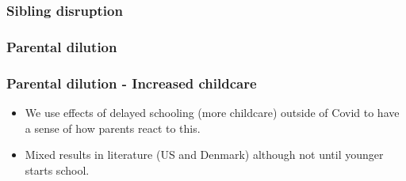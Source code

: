 \documentclass{beamer}
\begin{document}
\begin{frame}
    \label{frame:siblingdisruption}
    \frametitle{Sibling disruption}
        {
    }

\end{frame}

\begin{frame}
    \label{frame:parentaldilution}
    \frametitle{Parental dilution}
        {
    }

\end{frame}

\begin{frame}
    \label{frame:childcare}
    \frametitle{Parental dilution - Increased childcare}
       \begin{itemize}
            \item We use effects of delayed schooling (more childcare) outside of Covid to have a sense of how parents react to this.
            \item Mixed results in literature (US and Denmark) although not until younger starts school.
        \end{itemize}
\end{frame}      
\end{document}
